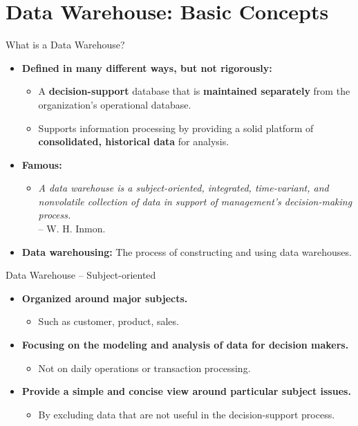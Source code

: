\section{Data Warehouse: Basic Concepts}

\begin{frame}{What is a Data Warehouse?}
	\begin{itemize}
		\item \textbf{Defined in many different ways, but not rigorously:}
		      \begin{itemize}
			      \item A \textbf{\color{airforceblue}decision-support} database that is \textbf{\color{airforceblue}maintained separately} from the organization's operational database.
			      \item Supports information processing by providing a solid platform of \textbf{\color{airforceblue}consolidated, historical data} for analysis.
		      \end{itemize}
		\item \textbf{Famous:} \\
		      \begin{itemize}
			      \item \emph{A data warehouse is a {\color{airforceblue}subject-oriented, integrated, time-variant, and nonvolatile} collection of data in support of management's decision-making process.}\\-- W. H. Inmon.
		      \end{itemize}
		\item \textbf{\color{airforceblue}Data warehousing:} The process of constructing and using data warehouses.
	\end{itemize}
\end{frame}

\begin{frame}{Data Warehouse -- Subject-oriented}
	\begin{itemize}
		\item \textbf{Organized around major subjects.}
		      \begin{itemize}
			      \item Such as customer, product, sales.
		      \end{itemize}
		\item \textbf{Focusing on the modeling and analysis of data for {\color{airforceblue}decision makers}.}
		      \begin{itemize}
			      \item Not on daily operations or transaction processing.
		      \end{itemize}
		\item \textbf{Provide a simple and concise view around particular subject issues.}
		      \begin{itemize}
			      \item By excluding data that are not useful in the decision-support process.
		      \end{itemize}
	\end{itemize}
\end{frame}

